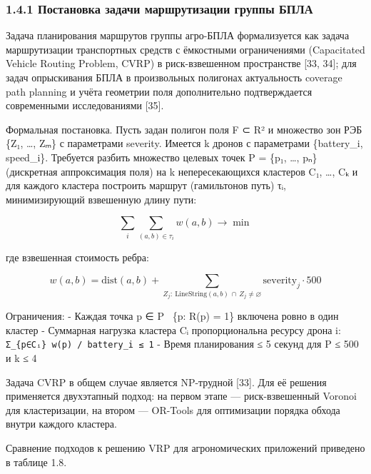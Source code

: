 \documentclass[14pt,a4paper]{extarticle}
\begin{document}
\hypertarget{ux43fux43eux441ux442ux430ux43dux43eux432ux43aux430-ux437ux430ux434ux430ux447ux438-ux43cux430ux440ux448ux440ux443ux442ux438ux437ux430ux446ux438ux438-ux433ux440ux443ux43fux43fux44b-ux431ux43fux43bux430}{%
\subsubsection{1.4.1 Постановка задачи маршрутизации группы БПЛА}\label{ux43fux43eux441ux442ux430ux43dux43eux432ux43aux430-ux437ux430ux434ux430ux447ux438-ux43cux430ux440ux448ux440ux443ux442ux438ux437ux430ux446ux438ux438-ux433ux440ux443ux43fux43fux44b-ux431ux43fux43bux430}}

Задача планирования маршрутов группы агро-БПЛА формализуется как задача маршрутизации транспортных средств с ёмкостными ограничениями (Capacitated Vehicle Routing Problem, CVRP) в риск-взвешенном пространстве {[}33, 34{]}; для задач опрыскивания БПЛА в произвольных полигонах актуальность coverage path planning и учёта геометрии поля дополнительно подтверждается современными исследованиями {[}35{]}.

Формальная постановка. Пусть задан полигон поля F ⊂ R² и множество зон РЭБ \{Z₁, \ldots, Zₘ\} с параметрами severity. Имеется k дронов с параметрами \{battery\_i, speed\_i\}. Требуется разбить множество целевых точек P = \{p₁, \ldots, pₙ\} (дискретная аппроксимация поля) на k непересекающихся кластеров C₁, \ldots, Cₖ и для каждого кластера построить маршрут (гамильтонов путь) τᵢ, минимизирующий взвешенную длину пути:

\[\sum_{i} \sum_{(a,b) \in \tau_i} w(a,b) \to \min\]

где взвешенная стоимость ребра:

\[w(a,b) = \mathrm{dist}(a,b) + \sum_{Z_j:\ \mathrm{LineString}(a,b)\, \cap\, Z_j \ne \varnothing} \mathrm{severity}_j \cdot 500\]

Ограничения: - Каждая точка p ∈ P ~\{p: R(p) = 1\} включена ровно в один кластер - Суммарная нагрузка кластера Cᵢ пропорциональна ресурсу дрона i: \texttt{Σ\_\{p∈Cᵢ\}\ w(p)\ /\ battery\_i\ ≤\ 1} - Время планирования ≤ 5 секунд для \textbar P\textbar{} ≤ 500 и k ≤ 4

Задача CVRP в общем случае является NP-трудной {[}33{]}. Для её решения применяется двухэтапный подход: на первом этапе --- риск-взвешенный Voronoi для кластеризации, на втором --- OR-Tools для оптимизации порядка обхода внутри каждого кластера.

Сравнение подходов к решению VRP для агрономических приложений приведено в таблице 1.8.
\end{document}
